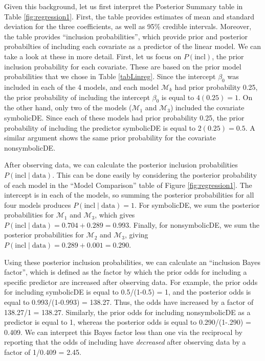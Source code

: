 \documentclass[english,,doc,floatsintext]{apa6}
\begin{document}
Given this background, let us first interpret the Posterior Summary table in Table \ref{fig:regression1}. First, the table provides estimates of mean and standard deviation for the three coefficients, as well as 95\% credible intervals. Moreover, the table provides \enquote{inclusion probabilities}, which provide prior and posterior probabilties of including each covariate as a predictor of the linear model. We can take a look at these in more detail. First, let us focus on \(P(\text{incl})\), the prior inclusion probability for each covariate. These are based on the prior model probabilities that we chose in Table \ref{tabLinreg}. Since the intercept \(\beta_{0}\) was included in each of the 4 models, and each model \(\mathcal{M}_{k}\) had prior probability 0.25, the prior probability of including the intercept \(\beta_{0}\) is equal to \(4(0.25) = 1\). On the other hand, only two of the models (\(\mathcal{M}_{1}\) and \(\mathcal{M}_{3}\)) included the covariate symbolicDE. Since each of these models had prior probability 0.25, the prior probability of including the predictor symbolicDE is equal to \(2(0.25) = 0.5\). A similar argument shows the same prior probability for the covariate nonsymbolicDE.

After observing data, we can calculate the posterior inclusion probabilities \(P(\text{incl}\mid \text{data})\). This can be done easily by considering the posterior probability of each model in the \enquote{Model Comparison} table of Figure \ref{fig:regression1}. The intercept is in each of the models, so summing the posterior probabilities for all four models produces \(P(\text{incl}\mid \text{data}) = 1\). For symbolicDE, we sum the posterior probabilities for \(\mathcal{M}_{1}\) and \(\mathcal{M}_{3}\), which gives \(P(\text{incl}\mid \text{data}) = 0.704 + 0.289 = 0.993\). Finally, for nonsymbolicDE, we sum the posterior probabilities for \(\mathcal{M}_{2}\) and \(\mathcal{M}_{3}\), giving \(P(\text{incl}\mid \text{data}) = 0.289 + 0.001 = 0.290\).

Using these posterior inclusion probabilities, we can calculate an \enquote{inclusion Bayes factor}, which is defined as the factor by which the prior odds for including a specific predictor are increased after observing data. For example, the prior odds for including symbolicDE is equal to 0.5/(1-0.5) = 1, and the posterior odds is equal to 0.993/(1-0.993) = 138.27. Thus, the odds have increased by a factor of 138.27/1 = 138.27. Similarly, the prior odds for including nonsymbolicDE as a predictor is equal to 1, whereas the posterior odds is equal to 0.290/(1-.290) = 0.409. We can interpret this Bayes factor less than one via the reciprocal by reporting that the odds of including have \emph{decreased} after observing data by a factor of 1/0.409 = 2.45.
\end{document}

